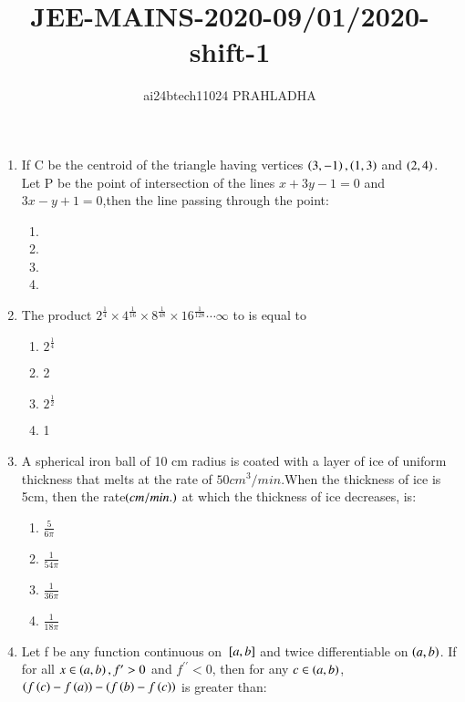 \documentclass[journal,12pt,twocolumn]{IEEEtran}
\theoremstyle{remark}
\begin{document}

\vspace{3cm}
\title{JEE-MAINS-2020-09/01/2020-shift-1}
\author{ai24btech11024 PRAHLADHA%
}
\maketitle
\newpage
\bigskip
\renewcommand{\thefigure}{\theenumi}
\renewcommand{\thetable}{\theenumi}
\begin{enumerate}
    \item If C be the centroid of the triangle having vertices $\left(3,-1\right),\left(1,3\right)$ and $\left(2,4\right)$. Let P be the point of intersection of the lines $x+3y-1=0$ and $3x-y+1=0$,then the line passing through the point$\colon$
    \begin{enumerate}
        \item {}
        \item {}
        \item {}
        \item {}
    \end{enumerate}
    \item The product $2^{\frac{1}{4}}\times4^{\frac{1}{16}}\times8^{\frac{1}{48}}\times16^{\frac{1}{128}}\cdots\infty$ to is equal to
    \begin{enumerate}
        \item $2^{\frac{1}{4}}$
        \item 2
        \item $2^{\frac{1}{2}}$
        \item 1
    \end{enumerate}
    \item A spherical iron ball of 10 cm radius is coated with a layer of ice of uniform thickness that melts at the rate of $50 cm^{3}/min$.When the thickness of ice is 5cm, then the rate$\left(cm/min.\right)$ at which the thickness of ice decreases, is$\colon$
    \begin{enumerate}
        \item $\frac{5}{6\pi}$
        \item $\frac{1}{54\pi}$
        \item $\frac{1}{36\pi}$
        \item $\frac{1}{18\pi}$
    \end{enumerate}
    \item Let f be any function continuous on ${}\left[a,b\right]$ and twice differentiable on $\left(a,b\right)$. If for all $x\in\left(a,b\right),f^{\prime}>0$ and $f^{\prime\prime}<0$, then for any $c\in\left(a,b\right)$, $\left(f\left(c\right)-f\left(a\right)\right)-\left(f\left(b\right)-f\left(c\right)\right)$ is greater than$\colon$

\end{enumerate}
\end{document}

